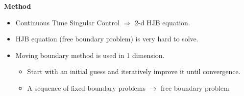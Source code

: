 \documentclass{beamer}
\begin{document}
%
\begin{frame}
{\bf Method}
\begin{itemize}
  \item Continuous Time Singular Control $\Rightarrow$ 2-d HJB equation.\\
  \item HJB equation (free boundary problem) is very hard to solve.\\
  \item Moving boundary method is used in 1 dimension.\\
  \begin{itemize}
  \item Start with an initial guess and iteratively improve it until convergence.\\
  \item A sequence of fixed boundary problems $\rightarrow$ free boundary problem\\
\end{itemize}
\end{itemize}
\end{frame}
\end{document}
